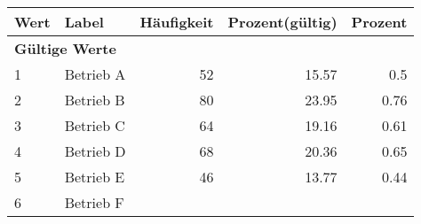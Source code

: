      \begin{longtable}{lXrrr}
     \toprule
     \textbf{Wert} & \textbf{Label} & \textbf{Häufigkeit} & \textbf{Prozent(gültig)} & \textbf{Prozent} \\
     \endhead
     \midrule
     \multicolumn{5}{l}{\textbf{Gültige Werte}}\\

     1 &
     \multicolumn{1}{X}{ Betrieb A   } &


       \num{52} &
       \num[round-mode=places,round-precision=2]{15.57} &
         \num[round-mode=places,round-precision=2]{0.5} \\

     2 &
     \multicolumn{1}{X}{ Betrieb B   } &


       \num{80} &
       \num[round-mode=places,round-precision=2]{23.95} &
         \num[round-mode=places,round-precision=2]{0.76} \\

     3 &
     \multicolumn{1}{X}{ Betrieb C   } &


       \num{64} &
       \num[round-mode=places,round-precision=2]{19.16} &
         \num[round-mode=places,round-precision=2]{0.61} \\

     4 &
     \multicolumn{1}{X}{ Betrieb D   } &


       \num{68} &
       \num[round-mode=places,round-precision=2]{20.36} &
         \num[round-mode=places,round-precision=2]{0.65} \\

     5 &
     \multicolumn{1}{X}{ Betrieb E   } &


       \num{46} &
       \num[round-mode=places,round-precision=2]{13.77} &
         \num[round-mode=places,round-precision=2]{0.44} \\

     6 &
     \multicolumn{1}{X}{ Betrieb F   } &



\end{longtable}
